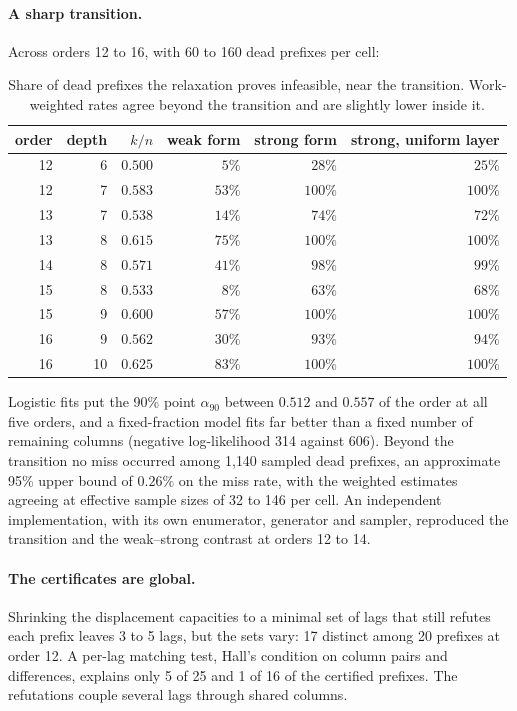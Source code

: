 \paragraph{A sharp transition.} Across orders 12 to 16, with 60 to 160 dead prefixes per cell:

\begin{table}[H]
\centering
\small
\begin{tabular}{@{}rrrrrr@{}}
\toprule
order & depth & $k/n$ & weak form & strong form & strong, uniform layer \\
\midrule
12 & 6 & $0.500$ & $5\%$ & $28\%$ & $25\%$ \\
12 & 7 & $0.583$ & $53\%$ & $100\%$ & $100\%$ \\
13 & 7 & $0.538$ & $14\%$ & $74\%$ & $72\%$ \\
13 & 8 & $0.615$ & $75\%$ & $100\%$ & $100\%$ \\
14 & 8 & $0.571$ & $41\%$ & $98\%$ & $99\%$ \\
15 & 8 & $0.533$ & $8\%$ & $63\%$ & $68\%$ \\
15 & 9 & $0.600$ & $57\%$ & $100\%$ & $100\%$ \\
16 & 9 & $0.562$ & $30\%$ & $93\%$ & $94\%$ \\
16 & 10 & $0.625$ & $83\%$ & $100\%$ & $100\%$ \\
\bottomrule
\end{tabular}
\caption{Share of dead prefixes the relaxation proves infeasible, near the transition. Work-weighted rates
agree beyond the transition and are slightly lower inside it.}
\label{tab:transition}
\end{table}

\noindent Logistic fits put the 90\% point $\alpha_{90}$ between $0.512$ and $0.557$ of the order at all five
orders, and a fixed-fraction model fits far better than a fixed number of remaining columns (negative
log-likelihood 314 against 606). Beyond the transition no miss occurred among 1{,}140 sampled dead
prefixes, an approximate 95\% upper bound of $0.26\%$ on the miss rate, with the weighted estimates agreeing
at effective sample sizes of 32 to 146 per cell. An independent implementation, with its own enumerator,
generator and sampler, reproduced the transition and the weak--strong contrast at orders 12 to 14.

\paragraph{The certificates are global.} Shrinking the displacement capacities to a minimal set of lags that
still refutes each prefix leaves 3 to 5 lags, but the sets vary: 17 distinct among 20 prefixes at order 12.
A per-lag matching test, Hall's condition on column pairs and differences, explains only 5 of 25 and 1 of 16
of the certified prefixes. The refutations couple several lags through shared columns.

